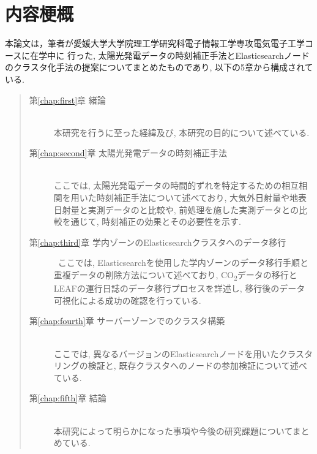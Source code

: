 \chapter*{内容梗概}

本論文は，筆者が愛媛大学大学院理工学研究科電子情報工学専攻電気電子工学コースに在学中に
行った, 太陽光発電データの時刻補正手法とElasticsearchノードのクラスタ化手法の提案についてまとめたものであり, 以下の5章から構成されている.\\

\begin{quote}
      \begin{description}

            \item[第\ref{chap:first}章 緒論]\ \\
            本研究を行うに至った経緯及び, 本研究の目的について述べている.
            \vspace{3.0mm}
            
            \item[第\ref{chap:second}章 太陽光発電データの時刻補正手法]\ \\
            ここでは, 太陽光発電データの時間的ずれを特定するための相互相関を用いた時刻補正手法について述べており, 大気外日射量や地表日射量と実測データのと比較や, 前処理を施した実測データとの比較を通じて, 時刻補正の効果とその必要性を示す. 
            \vspace{3.0mm}
            
            \item[第\ref{chap:third}章 学内ゾーンのElasticsearchクラスタへのデータ移行]\
            ここでは, Elasticsearchを使用した学内ゾーンのデータ移行手順と重複データの削除方法について述べており, CO\textsubscript{2}データの移行とLEAFの運行日誌のデータ移行プロセスを詳述し, 移行後のデータ可視化による成功の確認を行っている.
            \vspace{3.0mm}
            
            \item[第\ref{chap:fourth}章 サーバーゾーンでのクラスタ構築]\ \\
            ここでは, 異なるバージョンのElasticsearchノードを用いたクラスタリングの検証と, 既存クラスタへのノードの参加検証について述べている.
            \vspace{3.0mm}
            
            \item[第\ref{chap:fifth}章 結論]\ \\
            本研究によって明らかになった事項や今後の研究課題についてまとめている.
      \end{description}
\end{quote}
